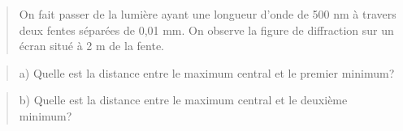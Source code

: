 \begin{quote}
On fait passer de la lumière ayant une longueur d'onde de 500 nm à
travers deux fentes séparées de 0,01 mm. On observe la figure de
diffraction sur un écran situé à 2 m de la fente.
\end{quote}

\begin{quote}
\end{quote}

\begin{quote}
a) Quelle est la distance entre le maximum central et le premier
minimum?
\end{quote}

\begin{quote}
\end{quote}

\begin{quote}
\end{quote}

\begin{quote}
\end{quote}

\begin{quote}
\end{quote}

\begin{quote}
\end{quote}

\begin{quote}
b) Quelle est la distance entre le maximum central et le deuxième
minimum?
\end{quote}

\begin{quote}
\end{quote}

\begin{quote}
\end{quote}

\begin{quote}
\end{quote}

\begin{quote}
\end{quote}

\begin{quote}
\end{quote}

\begin{quote}
\end{quote}

\begin{quote}
\end{quote}

